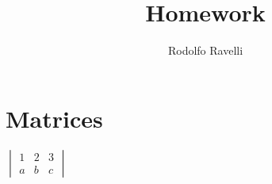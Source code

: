 \documentclass[12pt]{article}
\title{Homework}
\author{Rodolfo Ravelli}
\begin{document}
\maketitle

\section{Matrices}

\begin{center}
{\huge
$\begin{vmatrix}
1 & 2 & 3\\
a & b & c
\end{vmatrix}$
}
\end{center}
\end{document}

